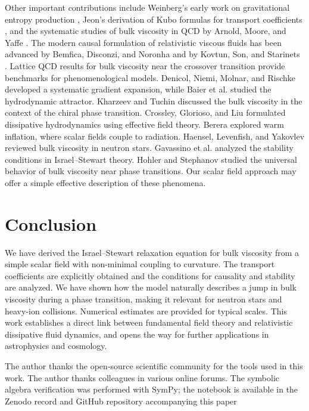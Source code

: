 \documentclass[aps,prd,reprint,superscriptaddress,floatfix]{revtex4-2}
\begin{document}
Other important contributions include Weinberg's early work on gravitational entropy production \cite{Weinberg1971}, Jeon's derivation of Kubo formulas for transport coefficients \cite{Jeon1995}, and the systematic studies of bulk viscosity in QCD by Arnold, Moore, and Yaffe \cite{ArnoldMooreYaffe}. The modern causal formulation of relativistic viscous fluids has been advanced by Bemfica, Disconzi, and Noronha \cite{Bemfica2022} and by Kovtun, Son, and Starinets \cite{Kovtun2005}. Lattice QCD results for bulk viscosity near the crossover transition \cite{Meyer2008, Borsanyi2012} provide benchmarks for phenomenological models. Denicol, Niemi, Molnar, and Rischke \cite{Denicol2012} developed a systematic gradient expansion, while Baier et al. \cite{Baier2008} studied the hydrodynamic attractor. Kharzeev and Tuchin \cite{Kharzeev2008} discussed the bulk viscosity in the context of the chiral phase transition. Crossley, Glorioso, and Liu \cite{Crossley2017} formulated dissipative hydrodynamics using effective field theory. Berera \cite{Berera2000} explored warm inflation, where scalar fields couple to radiation. Haensel, Levenfish, and Yakovlev \cite{Haensel2002} reviewed bulk viscosity in neutron stars. Gavassino et al. \cite{Gavassino2021} analyzed the stability conditions in Israel--Stewart theory. Hohler and Stephanov \cite{Hohler2009} studied the universal behavior of bulk viscosity near phase transitions. Our scalar field approach may offer a simple effective description of these phenomena.

\section{Conclusion}
\label{sec:conclusion}

We have derived the Israel--Stewart relaxation equation for bulk viscosity from a simple scalar field with non-minimal coupling to curvature. The transport coefficients are explicitly obtained and the conditions for causality and stability are analyzed. We have shown how the model naturally describes a jump in bulk viscosity during a phase transition, making it relevant for neutron stars and heavy-ion collisions. Numerical estimates are provided for typical scales. This work establishes a direct link between fundamental field theory and relativistic dissipative fluid dynamics, and opens the way for further applications in astrophysics and cosmology.

\begin{acknowledgments}
The author thanks the open‑source scientific community for the tools used in this work. The author thanks colleagues in various online forums. The symbolic algebra verification was performed with SymPy; the notebook is available in the Zenodo record and GitHub repository accompanying this paper
\end{acknowledgments}
\end{document}
